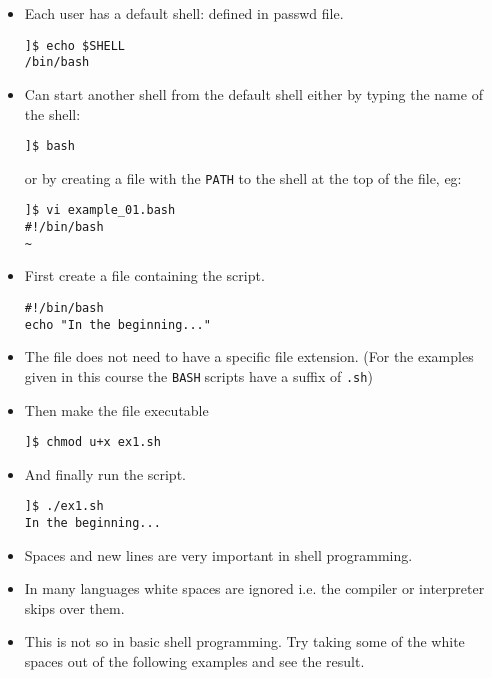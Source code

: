 \documentclass[17pt,dvips]{foils}
\def\bash{\texttt{BASH}$\;$}
\begin{document}

\begin{itemize}
\item Each user has a default shell: defined in passwd file.
\begin{verbatim}
]$ echo $SHELL
/bin/bash
\end{verbatim}
\item Can start another shell from the default shell either by typing
the name of the shell:
\begin{verbatim}
]$ bash
\end{verbatim}
or by creating a file with the \texttt{PATH} to the shell at the top
of the file, eg:
\begin{verbatim}
]$ vi example_01.bash
#!/bin/bash
~          
\end{verbatim} %
\end{itemize}



\begin{itemize}
\item First create a file containing the script.
%
\begin{verbatim}
#!/bin/bash
echo "In the beginning..."
\end{verbatim}
%
\item The file does not need to have a specific file extension.  (For
the examples given in this course the \bash scripts have a suffix of
\texttt{.sh})
%
\item Then make the file executable
%
\begin{verbatim}
]$ chmod u+x ex1.sh
\end{verbatim}
%
\item And finally run the script.
%
\begin{verbatim}
]$ ./ex1.sh
In the beginning...
\end{verbatim}
\end{itemize}

\vspace{1cm}


\begin{itemize}
\item Spaces and new lines are very important in shell programming.
\item In many languages white spaces are ignored i.e. the compiler or
interpreter skips over them.
\item This is not so in basic shell programming.  Try taking some of
the white spaces out of the following examples and see the result.
\end{itemize}
\end{document}
